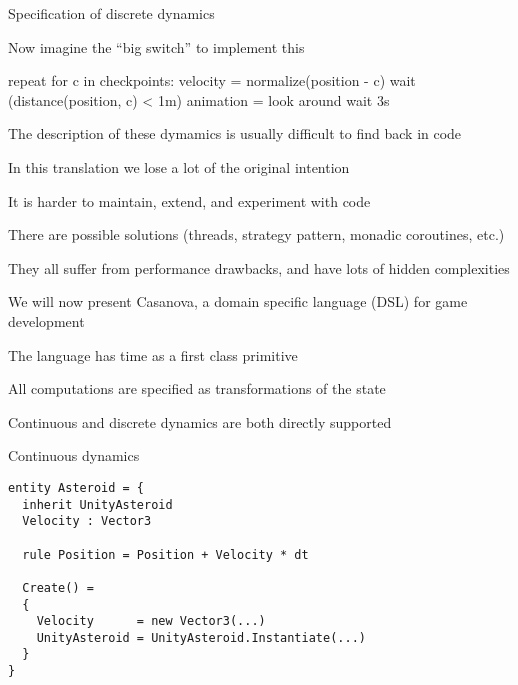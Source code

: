 \documentclass{beamer}
\begin{document}
\begin{frame}[fragile]{Specification of discrete dynamics}
\begin{codewithblock}{\pause \item Now imagine the ``big switch'' to implement this}
repeat
  for c in checkpoints:
    velocity = normalize(position - c)
    wait (distance(position, c) < 1m)
    animation = look around
    wait 3s
\end{codewithblock}
\end{frame}

\begin{slide}{
\item The description of these dymamics is usually difficult to find back in code
\item In this translation we lose a lot of the original intention
\item It is harder to maintain, extend, and experiment with code
}\end{slide}

\begin{slide}{
\item There are possible solutions (threads, strategy pattern, monadic coroutines, etc.)
\item They all suffer from performance drawbacks, and have lots of hidden complexities
}\end{slide}

\begin{slide}{
\item We will now present Casanova, a domain specific language (DSL) for game development
\item The language has time as a first class primitive
\item All computations are specified as transformations of the state
\item Continuous and discrete dynamics are both directly supported
}\end{slide}

\begin{frame}[fragile]{Continuous dynamics}
\begin{lstlisting}
entity Asteroid = {
  inherit UnityAsteroid
  Velocity : Vector3
  
  rule Position = Position + Velocity * dt

  Create() =
  {
    Velocity      = new Vector3(...)
    UnityAsteroid = UnityAsteroid.Instantiate(...)
  }
}
\end{lstlisting}
\end{frame}
\end{document}
